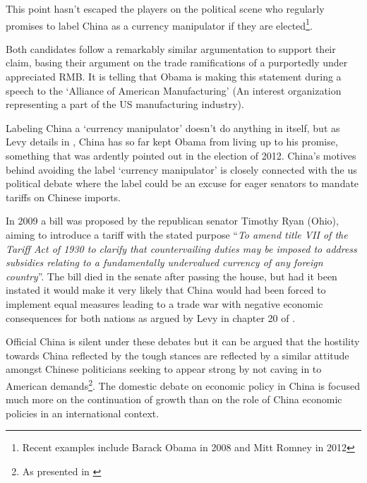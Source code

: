 This point hasn't escaped the players on the political scene who 
regularly promises to label China as a currency manipulator if they are 
elected\footnote{Recent examples include Barack Obama in 
2008\cite{Obama2008} and Mitt Romney in 2012\cite{Romney2012}}.  

Both candidates follow a remarkably similar argumentation to support 
their claim, basing their argument on the trade ramifications of a 
purportedly under appreciated RMB.  It is telling that Obama is making 
this statement during a speech to the `Alliance of American 
Manufacturing' (An interest organization representing a part of the US 
manufacturing industry).

Labeling China a `currency manipulator' doesn't do anything in itself, 
but as Levy details in \cite{Levy11}, China has so far kept Obama from 
living up to his promise, something that was ardently pointed out in the 
election of 2012. China's motives behind avoiding the label `currency 
manipulator' is closely connected with the us political debate where the 
label could be an excuse for eager senators to mandate tariffs on 
Chinese imports.

In 2009 a bill was proposed by the republican senator Timothy Ryan 
(Ohio), aiming to introduce a tariff with the stated purpose 
``\textit{To amend title VII of the Tariff Act of 1930 to clarify that 
	countervailing duties may be imposed to address subsidies relating 
	to a fundamentally undervalued currency of any foreign 
country}''\cite{Ryan2009}. The bill died in the senate after passing the 
house, but had it been instated it would make it very likely that China 
would had been forced to implement equal measures leading to a trade war 
with negative economic consequences for both nations as argued by Levy 
in chapter 20 of \cite{Evenett10}.

Official China is silent under these debates but it can be argued that 
the hostility towards China reflected by the tough stances are reflected 
by a similar attitude amongst Chinese politicians seeking to appear 
strong by not caving in to American demands\footnote{As presented in 
\cite{Levy11}}. The domestic debate on economic policy in China is 
focused much more on the continuation of growth than on the role of 
China economic policies in an international context. 


